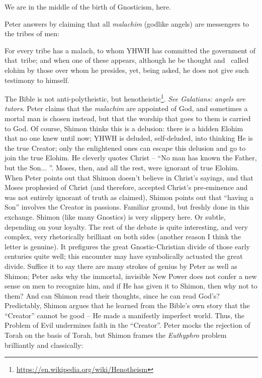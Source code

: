We are in the middle of the birth of Gnosticism, here.

Peter answers by claiming that all \emph{malachim} (godlike angels) are messengers to the tribes of men:

\begin{quotex}
For every tribe has a malach, to whom YHWH has committed the government of that~tribe; and when one of these appears, although he be thought and~ called elohim by those over whom he presides, yet, being asked, he does not give such testimony to himself.
\end{quotex}


The Bible is not anti-polytheistic, but henotheistic\footnote{\url{https://en.wikipedia.org/wiki/Henotheism}}. \emph{See Galatians: angels are tutors}. Peter claims that the \emph{malachim} are appointed of God, and sometimes a mortal man is chosen instead, but that the worship that goes to them is carried to God. Of course, Shimon thinks this is a delusion: there is a hidden Elohim that no one knew until now; YHWH is deluded, self-deluded, into thinking He is the true Creator; only the enlightened ones can escape this delusion and go to join the true Elohim. He cleverly quotes Christ -- ``No man has known the Father, but the Son... ''. Moses, then, and all the rest, were ignorant of true Elohim. When Peter points out that Shimon doesn't believe in Christ's sayings, and that Moses prophesied of Christ (and therefore, accepted Christ's pre-eminence and was not entirely ignorant of truth as claimed), Shimon points out that ``having a Son'' involves the Creator in passions. Familiar ground, but freshly done in this exchange. Shimon (like many Gnostics) is very slippery here. Or subtle, depending on your loyalty. The rest of the debate is quite interesting, and very complex, very rhetorically brilliant on both sides (another reason I think the letter is genuine). It prefigures the great Gnostic-Christian divide of those early centuries quite well; this encounter may have symbolically actuated the great divide. Suffice it to say there are many strokes of genius by Peter as well as Shimon; Peter asks why the immortal, invisible New Power does not confer a new sense on men to recognize him, and if He has given it to Shimon, then why not to them? And can Shimon read their thoughts, since he can read God's? Predictably, Shimon argues that he learned from the Bible's own story that the ``Creator'' cannot be good -- He made a manifestly imperfect world. Thus, the Problem of Evil undermines faith in the ``Creator''. Peter mocks the rejection of Torah on the basis of Torah, but Shimon frames the \emph{Euthyphro} problem brilliantly and classically:

